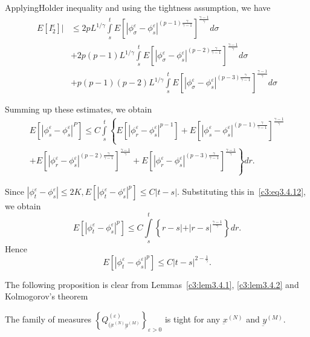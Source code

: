 Applying\pageoriginale Holder inequality and using the tightness assumption, we have 
\begin{align*}
  E\left[I^{\varepsilon}_2\right]| & \leq 2pL^{1 / \gamma} \int\limits^t_s
 E\left[|\phi^{\varepsilon}_{\sigma} -\phi^{\varepsilon}_{s}|^{(p-1)
    \frac{\gamma}{\gamma -1}} \right]^{\frac{\gamma -1}{\gamma}} d \sigma\\ 
   & + 2p(p-1) L^{1 / \gamma} \int\limits^t_s
    E\left[|\phi^{\varepsilon}_{\sigma} -\phi^{\varepsilon}_{s} |^{(p-2)
      \frac{\gamma}{\gamma -1}} \right]^{\frac{\gamma -1}{\gamma}} d \sigma\\ 
      & + p(p-1)(p-2) L^{1 / \gamma} \int\limits^t_s
     E\left[|\phi^{\varepsilon}_{\sigma} -\phi^{\varepsilon}_{s}|^{(p-3)
        \frac{\gamma}{\gamma -1}} \right]^{\frac{\gamma -1}{\gamma}} 
     d \sigma   \tag{3.4.11}\label{c3:eq3.4.11} 
\end{align*}

Summing up these estimates, we obtain 
\begin{multline*}
  E \left[|\phi^{\varepsilon}_s -\phi^{\varepsilon}_{s}|^P \right]  \leq C \int
  \limits^t_s \left\{E\left[| \phi^{\varepsilon}_r
    -\phi^{\varepsilon}_{s}|^{p-1}\right] + E \left[|\phi^{\varepsilon}_s
    -\phi^{\varepsilon}_{s}|^{(p-1) \frac{\gamma}{\gamma -1}}
    \right]^{\frac{\gamma -1}{\gamma}}\right. \\  
  +\left. E\left[|\phi^{\varepsilon}_r -\phi^{\varepsilon}_{s}|^{(p-2)
      \frac{\gamma}{\gamma -1}} \right]^{\frac{\gamma -1}{\gamma}}  +
  E\left[|\phi^{\varepsilon}_r -\phi^{\varepsilon}_{s}|^{(p-3)
      \frac{\gamma}{\gamma -1}} \right]^{\frac{\gamma -1}{\gamma}}\right\} dr.
  \tag{3.4.12}\label{c3:eq3.4.12} 
\end{multline*}

Since $|\phi^{\varepsilon}_t -\phi^{\varepsilon}_{s}| \leq 2K,
E[|\phi^{\varepsilon}_t -\phi^{\varepsilon}_{s}|^p] \leq C|
t-s|$. Substituting this in~\eqref{c3:eq3.4.12}, we obtain 
$$
E\left[|\phi^{\varepsilon}_t -\phi^{\varepsilon}_{s}|^p\right] \leq C \int
\limits^t_s \left\{ r-s|+|r-s|^{\frac{\gamma-1}{\gamma}} \right\} dr. 
$$
Hence 
$$
E[|\phi^{\varepsilon}_t -\phi^{\varepsilon}_{s}|^p] \leq C|t-s|^{2 -
  \frac{1}{\gamma}}. 
$$

The following proposition is clear from Lemmas~\ref{c3:lem3.4.1}, 
\ref{c3:lem3.4.2} and Kolmogorov's theorem 

\setcounter{proposition}{2}
\begin{proposition}\label{c3:prop3.4.3}%
  The family of measures $ \left\{ Q^{(\varepsilon)}_{(\underbar{x}^{(N)}
    \underbar{y}^{(M)}} \right\}_{\varepsilon > 0}$ is tight for any
  $\underbar{x}^{(N)}$ and $\underbar{y}^{(M)}$. 
\end{proposition}



